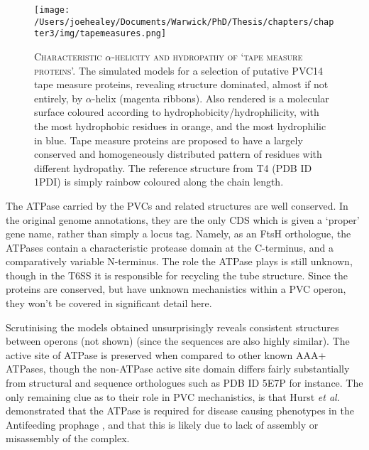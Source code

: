 \begin{figure}[h!]
 \thispagestyle{IHA-fancy-style}
 \centering
   \texttt{[image: /Users/joehealey/Documents/Warwick/PhD/Thesis/chapters/chapter3/img/tapemeasures.png]}
 \captionsetup{singlelinecheck=off, justification=justified, font=footnotesize, aboveskip=10pt}
 \caption[Conservation mapping off putative tail fibre structures]{\textsc{\normalsize Characteristic $\alpha$-helicity and hydropathy of `tape measure proteins'.}\vspace{0.1cm} \newline The simulated models for a selection of putative PVC14 tape measure proteins, revealing structure dominated, almost if not entirely, by $\alpha$-helix (magenta ribbons). Also rendered is a molecular surface coloured according to hydrophobicity/hydrophilicity, with the most hydrophobic residues in orange, and the most hydrophilic in blue. Tape measure proteins are proposed to have a largely conserved and homogeneously distributed pattern of residues with different hydropathy. The reference structure from T4 (PDB ID 1PDI) is simply rainbow coloured along the chain length. }
 \label{tapemeasures}
\end{figure}

The ATPase carried by the PVCs and related structures are well conserved. In the original genome annotations, they are the only CDS which is given a `proper' gene name, rather than simply a locus tag. Namely, as an FtsH orthologue, the ATPases contain a characteristic protease domain at the C-terminus, and a comparatively variable N-terminus. The role the ATPase plays is still unknown, though in the T6SS it is responsible for recycling the tube structure. Since the proteins are conserved, but have unknown mechanistics within a PVC operon, they won't be covered in significant detail here.

Scrutinising the models obtained unsurprisingly reveals consistent structures between operons (not shown) (since the sequences are also highly similar). The active site of ATPase is preserved when compared to other known AAA+ ATPases, though the non-ATPase active site domain differs fairly substantially from structural and sequence orthologues such as PDB ID 5E7P for instance. The only remaining clue as to their role in PVC mechanistics, is that Hurst \emph{et al.} demonstrated that the ATPase is required for disease causing phenotypes in the Antifeeding prophage \citep{Hurst2004, Rybakova2013}, and that this is likely due to lack of assembly or misassembly of the complex.


